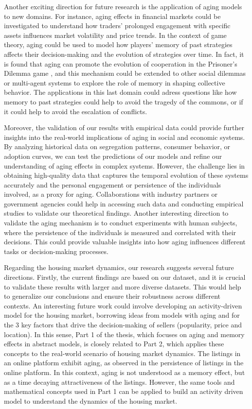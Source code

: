 Another exciting direction for future research is the application of aging models to new domains. For instance, aging effects in financial markets could be investigated to understand how traders' prolonged engagement with specific assets influences market volatility and price trends. In the context of game theory, aging could be used to model how players' memory of past strategies affects their decision-making and the evolution of strategies over time. In fact, it is found that aging can promote the evolution of cooperation in the Prisoner's Dilemma game \cite{vieira2023noisy}, and this mechanism could be extended to other social dilemmas or multi-agent systems to explore the role of memory in shaping collective behavior. The applications in this last domain could adress questions like how memory to past strategies could help to avoid the tragedy of the commons, or if it could help to avoid the escalation of conflicts.

Moreover, the validation of our results with empirical data could provide further insights into the real-world implications of aging in social and economic systems. By analyzing historical data on segregation patterns, consumer behavior, or adoption curves, we can test the predictions of our models and refine our understanding of aging effects in complex systems. However, the challenge lies in obtaining high-quality data that captures the temporal evolution of these systems accurately and the personal engagement or persistence of the individuals involved, as a proxy for aging. Collaborations with industry partners or government agencies could help in accessing such data and conducting empirical studies to validate our theoretical findings. Another interesting direction to validate the aging mechanism is to conduct experiments with human subjects, where the persistence of the individuals is measured and correlated with their decisions. This could provide valuable insights into how aging influences different tasks or decision-making processes.

Regarding the housing market dynamics, our research suggests several future directions. Firstly, the current findings are based on our dataset, and it is crucial to validate these results with larger and more diverse datasets. This would help to generalize our conclusions and ensure their robustness across different contexts. An interesting future work could involve developing an activity-driven model for the housing market, borrowing ideas from models with aging and for the 3 key factors that drive the decision-making of sellers (popularity, price and location). In this sense, Part 1 of the thesis, which focuses on aging and memory effects in abstract models, is closely related to Part 2, which applies these concepts to the real-world scenario of housing market dynamics. The listings in an online platform exhibit aging, as observed in the persistence of listings in the online platform. In this context, aging is not understood as a memory effect, but as a time decaying attractiveness of the listings. However, the same tools and mathematical concepts used in Part 1 can be applied to build an activity driven model to understand the dynamics of the housing market.

